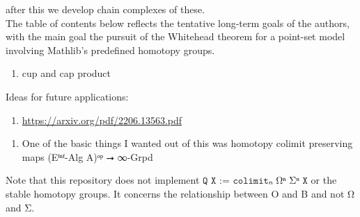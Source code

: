 \documentclass{book}
\theoremstyle{definition}
\begin{document}

after this we develop chain complexes of these.\\

The table of contents below reflects the tentative long-term goals of the authors, with the main goal the pursuit of the Whitehead theorem for a point-set model involving Mathlib's predefined homotopy groups.\\

\begin{enumerate}
\item cup and cap product
\end{enumerate}

Ideas for future applications:

\begin{enumerate}
\item \url{https://arxiv.org/pdf/2206.13563.pdf}
\end{enumerate}

\begin{enumerate}
\item One of the basic things I wanted out of this was homotopy colimit preserving maps (Eⁱⁿᶠ-Alg A)ᵒᵖ ⭢ ∞-Grpd
\end{enumerate}

Note that this repository does not implement $\texttt{Q X := colimitₙ Ωⁿ Σⁿ X}$ or the stable homotopy groups. It concerns the relationship between O and B and not Ω and Σ.\\

\end{document}
